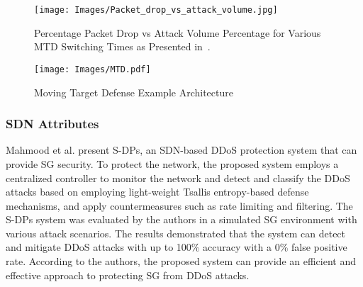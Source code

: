 \documentclass[conference]{IEEEtran}
\begin{document}
\begin{figure}[h]
\centering
\texttt{[image: Images/Packet\_drop\_vs\_attack\_volume.jpg]}
\caption{Percentage Packet Drop vs Attack Volume Percentage for Various
MTD Switching Times as Presented in~\cite{abdelkhalek2022moving}.}
\label{fig:Packet Drop}
\end{figure}

\begin{figure}[h]
\centering
\texttt{[image: Images/MTD.pdf]}
\caption{Moving Target Defense Example Architecture}
\label{fig:CPS Model}
\end{figure}



\subsubsection{SDN Attributes} Mahmood et al. \cite{mahmood2021s} present S-DPs, an SDN-based DDoS protection system that can provide SG security. To protect the network, the proposed system employs a centralized controller to monitor the network and detect and classify the DDoS attacks based on  employing light-weight Tsallis entropy-based defense mechanisms, and apply countermeasures such as rate limiting and filtering. The S-DPs system was evaluated by the authors in a simulated SG environment with various attack scenarios. The results demonstrated that the system can detect and mitigate DDoS attacks with up to 100\% accuracy with a 0\% false positive rate. According to the authors, the proposed system can provide an efficient and effective approach to protecting SG from DDoS attacks.
\end{document}
